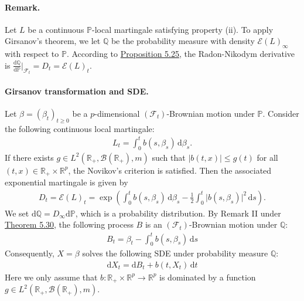 \documentclass{article}
\numberwithin{equation}{section}
\renewcommand{\P}{\mathbb{P}}
\newcommand{\bbP}{\mathbb{P}}
\newcommand{\bbQ}{\mathbb{Q}}
\renewcommand{\d}{\mathrm{d}}
\theoremstyle{plain}
\theoremstyle{definition}
\begin{document}
\paragraph{Remark.} Let $L$ be a continuous $\P$-local martingale satisfying property (ii). To apply Girsanov's theorem, we let $\bbQ$ be the probability measure with density $\mathscr{E}(L)_\infty$ with respect to $\bbP$. According to \hyperref[prop:5.25]{Proposition 5.25}, the Radon-Nikodym derivative is $\frac{\d\bbQ}{\d\bbP}|_{\mathscr{F}_t}=D_t=\mathscr{E}(L)_t$.

\paragraph{Girsanov transformation and SDE.} Let $\beta=(\beta_t)_{t\geq 0}$ be a $p$-dimensional $(\mathscr{F}_t)$-Brownian motion under $\bbP$. Consider the following continuous local martingale:
\begin{align*}
	L_t = \int_0^t b(s,\beta_s)\,\d\beta_s.
\end{align*}
If there exists $g\in L^2(\mathbb{R}_+,\mathscr{B}(\mathbb{R}_+),m)$ such that $\vert b(t,x)\vert\leq g(t)$ for all $(t,x)\in\mathbb{R}_+\times\mathbb{R}^p$, the Novikov's criterion is satisfied. Then the associated exponential martingale is given by
\begin{align*}
	D_t=\mathscr{E}(L)_t = \exp\left(\int_0^t b(s,\beta_s)\,\d\beta_s-\frac{1}{2}\int_0^t\vert b(s,\beta_s)\vert^2\,\d s\right).
\end{align*}
We set $\d\bbQ = D_\infty\d\bbP$, which is a probability distribution. By Remark II under \hyperref[thm:5.30]{Theorem 5.30}, the following process $B$ is an $(\mathscr{F}_t)$-Brownian motion under $\bbQ$:
\begin{align*}
	B_t = \beta_t - \int_0^t b(s,\beta_s)\,\d s
\end{align*}
Consequently, $X=\beta$ solves the following SDE under probability measure $\bbQ$:
\begin{align*}
	\d X_t = \d B_t + b(t,X_t)\,\d t
\end{align*}
Here we only assume that $b:\mathbb{R}_+\times\mathbb{R}^p\to\mathbb{R}^p$ is dominated by a function $g\in L^2(\mathbb{R}_+,\mathscr{B}(\mathbb{R}_+),m)$.
\end{document}
